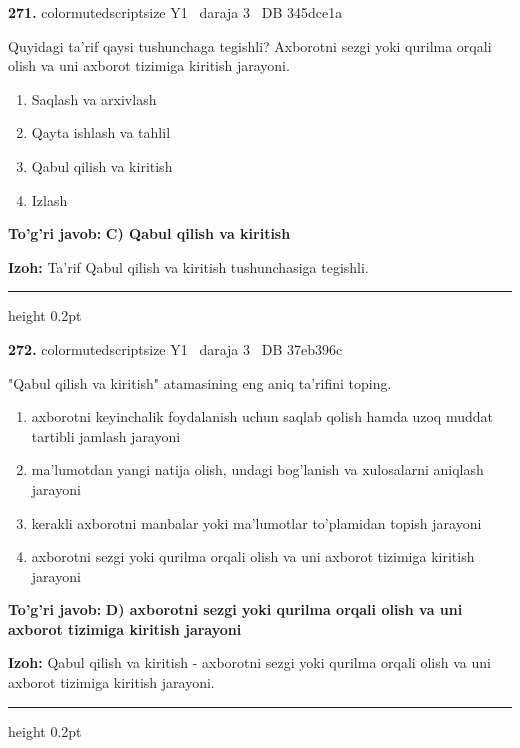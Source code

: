 \documentclass[10pt,a4paper,oneside]{article}
\begin{document}
\noindent\textbf{\color{ink}271.}  {color{muted}scriptsize Y1 \textbullet\ daraja 3 \textbullet\ DB 345dce1a}
\par
Quyidagi ta'rif qaysi tushunchaga tegishli? Axborotni sezgi yoki qurilma orqali olish va uni axborot tizimiga kiritish jarayoni.
\begin{enumerate}[label=\Alph*),leftmargin=9mm]
\item Saqlash va arxivlash
\item Qayta ishlash va tahlil
\item Qabul qilish va kiritish
\item Izlash
\end{enumerate}
\begin{tcolorbox}[enhanced,breakable,colback=teal!4,colframe=teal!50!black,boxrule=0.5pt,arc=1.1mm,left=3mm,right=3mm,top=1.7mm,bottom=1.7mm,before skip=2mm,after skip=2mm]
\textbf{\color{teal}To'g'ri javob:} \textbf{C) Qabul qilish va kiritish}
\par\smallskip
\textbf{Izoh:} Ta'rif Qabul qilish va kiritish tushunchasiga tegishli.
\end{tcolorbox}
\vspace{2mm}\hrule height 0.2pt \vspace{3mm}

\noindent\textbf{\color{ink}272.}  {color{muted}scriptsize Y1 \textbullet\ daraja 3 \textbullet\ DB 37eb396c}
\par
"Qabul qilish va kiritish" atamasining eng aniq ta'rifini toping.
\begin{enumerate}[label=\Alph*),leftmargin=9mm]
\item axborotni keyinchalik foydalanish uchun saqlab qolish hamda uzoq muddat tartibli jamlash jarayoni
\item ma'lumotdan yangi natija olish, undagi bog'lanish va xulosalarni aniqlash jarayoni
\item kerakli axborotni manbalar yoki ma'lumotlar to'plamidan topish jarayoni
\item axborotni sezgi yoki qurilma orqali olish va uni axborot tizimiga kiritish jarayoni
\end{enumerate}
\begin{tcolorbox}[enhanced,breakable,colback=teal!4,colframe=teal!50!black,boxrule=0.5pt,arc=1.1mm,left=3mm,right=3mm,top=1.7mm,bottom=1.7mm,before skip=2mm,after skip=2mm]
\textbf{\color{teal}To'g'ri javob:} \textbf{D) axborotni sezgi yoki qurilma orqali olish va uni axborot tizimiga kiritish jarayoni}
\par\smallskip
\textbf{Izoh:} Qabul qilish va kiritish - axborotni sezgi yoki qurilma orqali olish va uni axborot tizimiga kiritish jarayoni.
\end{tcolorbox}
\vspace{2mm}\hrule height 0.2pt \vspace{3mm}
\end{document}
